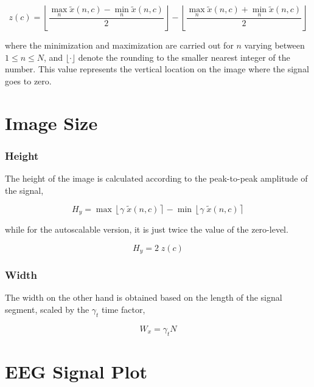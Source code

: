 \begin{equation}
z(c) = \left \lfloor{ \frac{\max_{n} \tilde{x}(n,c)  - \min_{n} \tilde{x}(n,c) }{2} }\right \rfloor -   \left \lfloor{ \frac{\max_{n} \tilde{x}(n,c)  + \min_{n} \tilde{x}(n,c)}{ 2} }\right \rfloor
\label{eq:zerolevel}
\end{equation}

\noindent where the minimization and maximization are carried out for $n$ varying between ${1 \leq n\leq N}$, and $ \lfloor \cdot  \rfloor $ denote the rounding to the smaller nearest integer of the number.  This value represents the vertical location on the image where the signal goes to zero.  

\section{Image Size}

\subsubsection{Height}

The height of the image is calculated according to the peak-to-peak amplitude of the signal,

\begin{equation}
H_y = \max \left\lfloor \gamma \; \tilde{x}(n,c) \right\rceil  - \min \left\lfloor \gamma \; \tilde{x}(n,c) \right\rceil 
\label{eq:height}
\end{equation}

\noindent while for the autoscalable version, it is just twice the value of the zero-level.

\begin{equation}
H_y = 2 \; z(c)
\label{eq:autoscaleheight}
\end{equation}


\subsubsection{Width}

The width on the other hand is obtained based on the length of the signal segment, scaled by the $\gamma_t$  time factor,

\begin{equation}
W_x = \gamma_t  N
\label{eq:width}
\end{equation}

\section{EEG Signal Plot}


